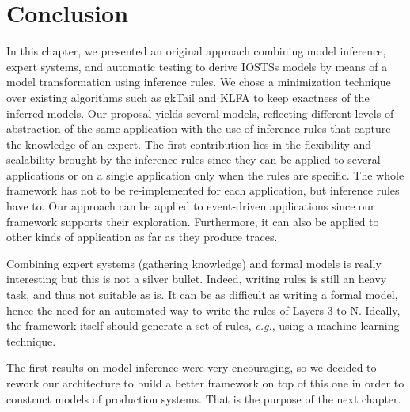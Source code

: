 \section{Conclusion}
\label{sec:modelinf:webapps:conclusion}

In this chapter, we presented an original approach combining
model inference, expert systems, and automatic testing to derive
IOSTSs models by means of a model transformation using inference
rules.  We chose a minimization technique over existing
algorithms such as gkTail and KLFA to keep exactness of the
inferred models. Our proposal yields several models, reflecting
different levels of abstraction of the same application with the
use of inference rules that capture the knowledge of an expert.
The first contribution lies in the flexibility and scalability
brought by the inference rules since they can be applied to
several applications or on a single application only when the
rules are specific. The whole framework has not to be
re-implemented for each application, but inference rules have to.
Our approach can be applied to event-driven applications since
our framework supports their exploration. Furthermore, it can
also be applied to other kinds of application as far as they
produce traces.

Combining expert systems (gathering knowledge) and formal models
is really interesting but this is not a silver bullet. Indeed,
writing rules is still an heavy task, and thus not suitable as
is. It can be as difficult as writing a formal model, hence the
need for an automated way to write the rules of Layers 3 to N.
Ideally, the framework itself should generate a set of rules,
\emph{e.g.}, using a machine learning technique.

The first results on model inference were very encouraging, so we
decided to rework our architecture to build a better framework on
top of this one in order to construct models of production
systems. That is the purpose of the next chapter.
